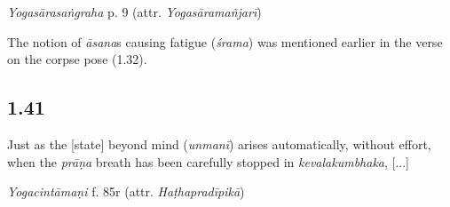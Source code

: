 \begin{ekdosis}
\begin{testimonia}[hp01_040]
\emph{Yogasārasaṅgraha} p. 9 (attr. \emph{Yogasāramañjarī})

\begin{versinnote}
\end{versinnote}

\end{testimonia}

\begin{philcomm}[hp01_040]






The notion of \emph{āsana}s causing fatigue (\emph{śrama}) was mentioned earlier in the verse on the corpse pose (1.32).
\end{philcomm}


\subsection*{1.41}
\begin{translation}[hp01_041]
Just as the [state] beyond mind (\emph{unmanī}) arises automatically, without effort, when the \emph{prāṇa} breath has been carefully stopped in \emph{kevalakumbhaka}, [...]
\end{translation}


\begin{testimonia}[hp01_041]
\emph{Yogacintāmaṇi} f. 85r (attr. \emph{Haṭhapradīpikā})


\end{testimonia}
\end{ekdosis}

